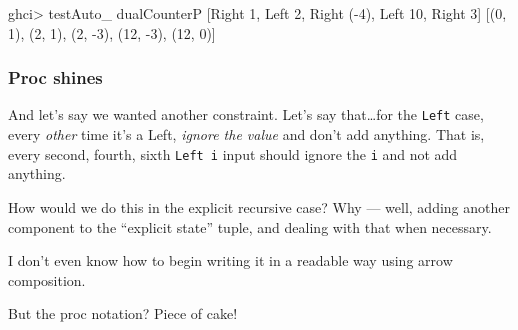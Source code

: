\documentclass[]{article}
\newenvironment{Shaded}{}{}
\newcommand{\DataTypeTok}[1]{\textcolor[rgb]{0.56,0.13,0.00}{#1}}
\newcommand{\DecValTok}[1]{\textcolor[rgb]{0.25,0.63,0.44}{#1}}
\newcommand{\FunctionTok}[1]{\textcolor[rgb]{0.02,0.16,0.49}{#1}}
\newcommand{\NormalTok}[1]{#1}
\begin{document}
\begin{Shaded}
\begin{Highlighting}[]
\NormalTok{ghci}\FunctionTok{>}\NormalTok{ testAuto_ dualCounterP [}\DataTypeTok{Right} \DecValTok{1}\NormalTok{, }\DataTypeTok{Left} \DecValTok{2}\NormalTok{, }\DataTypeTok{Right}\NormalTok{ (}\FunctionTok{-}\DecValTok{4}\NormalTok{), }\DataTypeTok{Left} \DecValTok{10}\NormalTok{, }\DataTypeTok{Right} \DecValTok{3}\NormalTok{]}
\NormalTok{[(}\DecValTok{0}\NormalTok{, }\DecValTok{1}\NormalTok{), (}\DecValTok{2}\NormalTok{, }\DecValTok{1}\NormalTok{), (}\DecValTok{2}\NormalTok{, }\FunctionTok{-}\DecValTok{3}\NormalTok{), (}\DecValTok{12}\NormalTok{, }\FunctionTok{-}\DecValTok{3}\NormalTok{), (}\DecValTok{12}\NormalTok{, }\DecValTok{0}\NormalTok{)]}
\end{Highlighting}
\end{Shaded}

\hypertarget{proc-shines}{%
\subsubsection{Proc shines}\label{proc-shines}}

And let's say we wanted another constraint. Let's say that\ldots{}for the
\texttt{Left} case, every \emph{other} time it's a Left, \emph{ignore the value}
and don't add anything. That is, every second, fourth, sixth \texttt{Left\ i}
input should ignore the \texttt{i} and not add anything.

How would we do this in the explicit recursive case? Why --- well, adding
another component to the ``explicit state'' tuple, and dealing with that when
necessary.

I don't even know how to begin writing it in a readable way using arrow
composition.

But the proc notation? Piece of cake!
\end{document}
